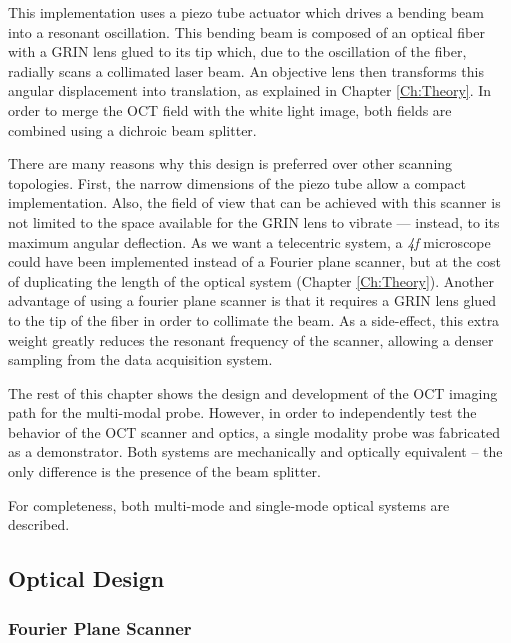 This implementation uses a piezo tube actuator which drives a bending beam into a resonant oscillation. This bending beam is composed of an optical fiber with a GRIN lens glued to its tip which, due to the oscillation of the fiber, radially scans a collimated laser beam. An objective lens then transforms this angular displacement into translation, as explained in Chapter \ref{Ch:Theory}. In order to merge the OCT field with the white light image, both fields are combined using a dichroic beam splitter.

There are many reasons why this design is preferred over other scanning topologies. First, the narrow dimensions of the piezo tube allow a compact implementation. Also, the field of view that can be achieved with this scanner is not limited to the space available for the GRIN lens to vibrate --- instead, to its maximum angular deflection. As we want a telecentric system, a \textit{4f} microscope could have been implemented instead of a Fourier plane scanner, but at the cost of duplicating the length of the optical system (Chapter \ref{Ch:Theory}). Another advantage of using a fourier plane scanner is that it requires a GRIN lens glued to the tip of the fiber in order to collimate the beam. As a side-effect, this extra weight greatly reduces the resonant frequency of the scanner, allowing a denser sampling from the data acquisition system. 

The rest of this chapter shows the design and development of the OCT imaging path for the multi-modal probe. However, in order to independently test the behavior of the OCT scanner and optics, a single modality probe was fabricated as a demonstrator. Both systems are mechanically and optically equivalent -- the only difference is the presence of the beam splitter. 

For completeness, both multi-mode and single-mode optical systems are described.



\newpage
\subsection{Optical Design}

\subsubsection*{Fourier Plane Scanner}



